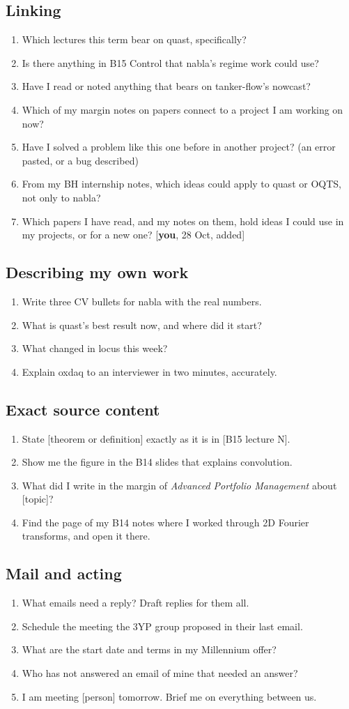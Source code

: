 \documentclass[10pt]{extarticle}
\newcommand{\youx}[1]{{\small[\textbf{you}, #1]}}
\newcommand{\Sub}[1]{\subsection*{#1}}
\begin{document}
\Sub{Linking}
{\small\begin{enumerate}[label=\arabic*.,start=7]
\item Which lectures this term bear on quast, specifically?
\item Is there anything in B15 Control that nabla's regime work could use?
\item Have I read or noted anything that bears on tanker-flow's nowcast?
\item Which of my margin notes on papers connect to a project I am working on now?
\item Have I solved a problem like this one before in another project? (an error pasted, or a bug described)
\item From my BH internship notes, which ideas could apply to quast or OQTS, not only to nabla?
\item Which papers I have read, and my notes on them, hold ideas I could use in my projects, or for a new one? \youx{28 Oct, added}
\end{enumerate}}

\Sub{Describing my own work}
{\small\begin{enumerate}[label=\arabic*.,start=14]
\item Write three CV bullets for nabla with the real numbers.
\item What is quast's best result now, and where did it start?
\item What changed in locus this week?
\item Explain oxdaq to an interviewer in two minutes, accurately.
\end{enumerate}}

\Sub{Exact source content}
{\small\begin{enumerate}[label=\arabic*.,start=18]
\item State [theorem or definition] exactly as it is in [B15 lecture N].
\item Show me the figure in the B14 slides that explains convolution.
\item What did I write in the margin of \textit{Advanced Portfolio Management} about [topic]?
\item Find the page of my B14 notes where I worked through 2D Fourier transforms, and open it there.
\end{enumerate}}

\Sub{Mail and acting}
{\small\begin{enumerate}[label=\arabic*.,start=22]
\item What emails need a reply? Draft replies for them all.
\item Schedule the meeting the 3YP group proposed in their last email.
\item What are the start date and terms in my Millennium offer?
\item Who has not answered an email of mine that needed an answer?
\item I am meeting [person] tomorrow. Brief me on everything between us.
\end{enumerate}}
\end{document}
